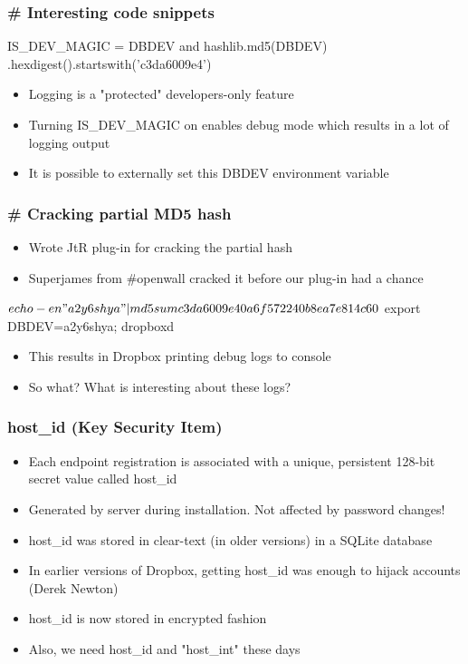 \documentclass{beamer}
\begin{document}
\begin{frame}[fragile]
\frametitle{\# Interesting code snippets}
\begin{python}
    IS_DEV_MAGIC = DBDEV and hashlib.md5(DBDEV)
        .hexdigest().startswith('c3da6009e4')
\end{python}
\begin{itemize}
\itemsep 2em
\item Logging is a "protected" developers-only feature
\item Turning IS\_DEV\_MAGIC on enables debug mode which results in a lot of logging output
\item It is possible to externally set this DBDEV environment variable
\end{itemize}
\end{frame}

\begin{frame}[fragile]
\frametitle{\# Cracking partial MD5 hash}
\begin{itemize}
\itemsep 1.8em
\item Wrote JtR plug-in for cracking the partial hash
\item Superjames from \#openwall cracked it before our plug-in had a chance
\end{itemize}
\begin{python}
    $ echo -en "a2y6shya" | md5sum
       c3da6009e40a6f572240b8ea7e814c60

    $ export DBDEV=a2y6shya; dropboxd
\end{python}
\begin{itemize}
\item This results in Dropbox printing debug logs to console
\item So what? What is interesting about these logs?
\end{itemize}
\end{frame}

\begin{frame}
\frametitle{host\_id (Key Security Item)}
\begin{itemize}
\itemsep 1em
\item Each endpoint registration is associated with a unique, persistent 128-bit secret value called host\_id

\item Generated by server during installation. Not affected by password changes!

\item host\_id was stored in clear-text (in older versions) in a SQLite database

\item In earlier versions of Dropbox, getting host\_id was enough to hijack
accounts (Derek Newton)

\item host\_id is now stored in encrypted fashion

\item Also, we need host\_id and "host\_int" these days

\end{itemize}
\end{frame}
\end{document}
